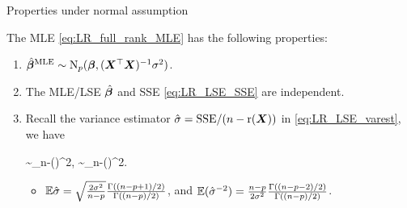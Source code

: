 \documentclass[10pt,a4paper]{book}
\begin{document}
\begin{thmbox}{Properties under normal assumption}
	\begin{proposition}\label{prop:LR_full_rank_normal_prop} The MLE \eqref{eq:LR_full_rank_MLE} has the following properties:
		\begin{enumerate}
			\item $\hat{{\boldsymbol\beta}}^{\mathrm{MLE}}\sim\mathrm{N}_p({\boldsymbol\beta},({\boldsymbol X}^\top{\boldsymbol X})^{-1}\sigma^2)$. 
			\item The MLE/LSE $\hat{{\boldsymbol\beta}}$ and SSE \eqref{eq:LR_LSE_SSE} are independent.
			\item Recall the variance estimator $\hat{\sigma}=\mathrm{SSE}/(n-\mathrm{r}({\boldsymbol X}))$ in \eqref{eq:LR_LSE_varest}, we have \begin{salign*}
				\sim\chi_{n-\rmr(\X)}^2, \quad {} \quad {}\sim\chi_{n-\rmr(\X)}^2.
			\end{salign*}
			\begin{itemize}
				\item $\mathbb E\hat{\sigma}=\sqrt{\frac{2\sigma^2}{n-p}}\frac{\Gamma((n-p+1)/2)}{\Gamma((n-p)/2)}$, and $\mathbb E(\hat{\sigma}^{-2})=\frac{n-p}{2\sigma^2}\frac{\Gamma((n-p-2)/2)}{\Gamma((n-p)/2)}$.
			\end{itemize}
		\end{enumerate}
	\end{proposition}
\end{thmbox}
\end{document}
